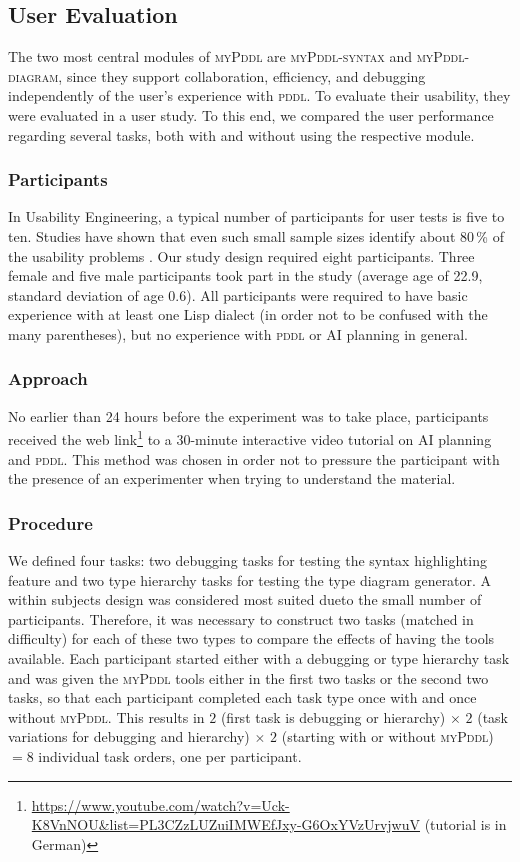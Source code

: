 \documentclass[runningheads]{llncs}
\newcommand{\mypddl}{\textsc{myPddl}\xspace}
\newcommand{\mypddlsyntax}{\textsc{myPddl-syntax}\xspace}
\newcommand{\mypddldiagram}{\textsc{myPddl-diagram}\xspace}
\newcommand{\pddl}{\textsc{pddl}\xspace}
\begin{document}
\subsection{User Evaluation}

The two most central modules of \mypddl are \mypddlsyntax and
\mypddldiagram, since they support collaboration, efficiency, and
debugging independently of the user’s experience with \pddl. To
evaluate their usability, they were evaluated in a user study. To this
end, we compared the user performance regarding several tasks, both
with and without using the respective module.

\subsubsection{Participants}

In Usability Engineering, a typical number of participants for user
tests is five to ten. Studies have shown that even such small sample
sizes identify about 80\,\% of the usability problems
\cite{nielsen1994estimating,hwang2010number}. Our study design
required eight participants. Three female and five male participants
took part in the study (average age of 22.9, standard deviation of age
0.6). All participants were required to have basic experience with at
least one Lisp dialect (in order not to be confused with the many
parentheses), but no experience with \pddl or AI planning in general.

\subsubsection{Approach}

No earlier than 24 hours before the experiment was to take place,
participants received the web
link\footnote{\url{https://www.youtube.com/watch?v=Uck-K8VnNOU&list=PL3CZzLUZuiIMWEfJxy-G6OxYVzUrvjwuV} (tutorial is in German)}
to a 30-minute interactive video tutorial on AI planning and
\pddl. This method was chosen in order not to pressure the participant
with the presence of an experimenter when trying to understand the
material.

\subsubsection{Procedure}

We defined four tasks: two debugging tasks for testing the syntax
highlighting feature and two type hierarchy tasks for testing the type
diagram generator. A within subjects design was considered most suited
dueto the small number of participants. Therefore, it was necessary to
construct two tasks (matched in difficulty) for each of these two
types to compare the effects of having the tools available. Each
participant started either with a debugging or type hierarchy task and
was given the \mypddl tools either in the first two tasks or the
second two tasks, so that each participant completed each task type
once with and once without \mypddl. This results in $2$ (first task is
debugging or hierarchy) $\times$ $2$ (task variations for debugging
and hierarchy) $\times$ $2$ (starting with or without \mypddl) $= 8$
individual task orders, one per participant.
\end{document}
